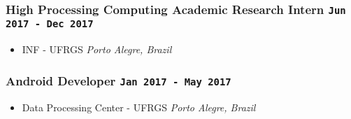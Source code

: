 \documentclass[11pt]{article}
\begin{document}
\subsubsection*{High Processing Computing Academic Research Intern \hfill \texttt{Jun 2017 - Dec 2017}}
\label{sec:org92d7db3}
\begin{itemize}
\item INF - UFRGS \hfill \emph{Porto Alegre, Brazil}
\label{sec:org6809cc7}
\end{itemize}

\subsubsection*{Android Developer \hfill \texttt{Jan 2017 - May 2017}}
\label{sec:orga987af6}
\begin{itemize}
\item Data Processing Center - UFRGS \hfill \emph{Porto Alegre, Brazil}
\label{sec:org79ed0e2}
\end{itemize}
\end{document}
